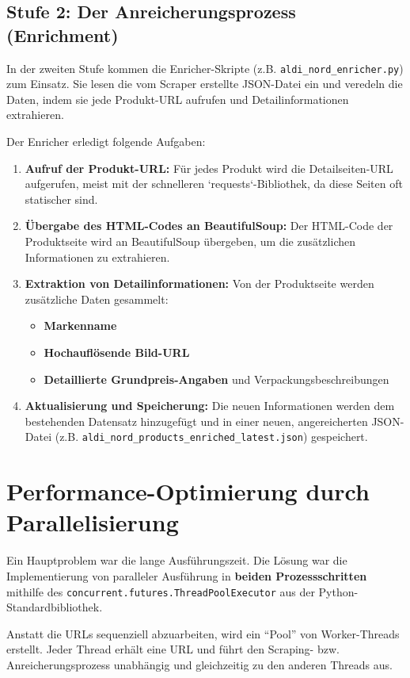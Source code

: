 \subsection{Stufe 2: Der Anreicherungsprozess (Enrichment)}
In der zweiten Stufe kommen die Enricher-Skripte (z.B. \texttt{aldi\_nord\_enricher.py}) zum Einsatz. Sie lesen die vom Scraper erstellte JSON-Datei ein und veredeln die Daten, indem sie jede Produkt-URL aufrufen und Detailinformationen extrahieren.

Der Enricher erledigt folgende Aufgaben:
\begin{enumerate}
    \item \textbf{Aufruf der Produkt-URL:} Für jedes Produkt wird die Detailseiten-URL aufgerufen, meist mit der schnelleren `requests`-Bibliothek, da diese Seiten oft statischer sind.
    \item \textbf{Übergabe des HTML-Codes an BeautifulSoup:} Der HTML-Code der Produktseite wird an BeautifulSoup übergeben, um die zusätzlichen Informationen zu extrahieren.
    \item \textbf{Extraktion von Detailinformationen:} Von der Produktseite werden zusätzliche Daten gesammelt:
        \begin{itemize}
            \item \textbf{Markenname}
            \item \textbf{Hochauflösende Bild-URL}
            \item \textbf{Detaillierte Grundpreis-Angaben} und Verpackungsbeschreibungen
        \end{itemize}
    \item \textbf{Aktualisierung und Speicherung:} Die neuen Informationen werden dem bestehenden Datensatz hinzugefügt und in einer neuen, angereicherten JSON-Datei (z.B. \texttt{aldi\_nord\_products\_enriched\_latest.json}) gespeichert.
\end{enumerate}

\section{Performance-Optimierung durch Parallelisierung}
\label{sec:scraping_performance}
Ein Hauptproblem war die lange Ausführungszeit. Die Lösung war die Implementierung von paralleler Ausführung in \textbf{beiden Prozessschritten} mithilfe des \texttt{concurrent.futures.ThreadPoolExecutor} aus der Python-Standardbibliothek.

Anstatt die URLs sequenziell abzuarbeiten, wird ein "`Pool"' von Worker-Threads erstellt. Jeder Thread erhält eine URL und führt den Scraping- bzw. Anreicherungsprozess unabhängig und gleichzeitig zu den anderen Threads aus.

